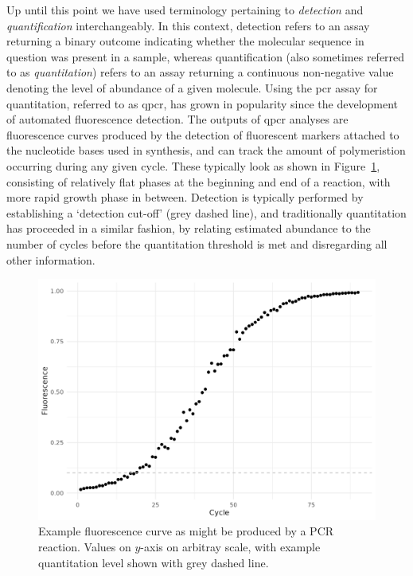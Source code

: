 \documentclass[thesis.tex]{subfiles}
\begin{document}
Up until this point we have used terminology pertaining to \emph{detection} and \emph{quantification} interchangeably. In this context, detection refers to an assay returning a binary outcome indicating whether the molecular sequence in question was present in a sample, whereas quantification (also sometimes referred to as \emph{quantitation}) refers to an assay returning a continuous non-negative value denoting the level of abundance of a given molecule. Using the \gls{pcr} assay for quantitation, referred to as \gls{qpcr}, has grown in popularity since the development of automated fluorescence detection. The outputs of \gls{qpcr} analyses are fluorescence curves produced by the detection of fluorescent markers attached to the nucleotide bases used in synthesis, and can track the amount of polymeristion occurring during any given cycle. These typically look as shown in Figure~\ref{fig:sim_fluor_fig}, consisting of relatively flat phases at the beginning and end of a reaction, with more rapid growth phase in between. Detection is typically performed by establishing a `detection cut-off' (grey dashed line), and traditionally quantitation has proceeded in a similar fashion, by relating estimated abundance to the number of cycles before the quantitation threshold is met and disregarding all other information.

\begin{figure}
    \centering
    \includegraphics[width=5in]{figures/chapter1/sim_fluor_fig.png}
    \caption{Example fluorescence curve as might be produced by a PCR reaction. Values on $y$-axis on arbitray scale, with example quantitation level shown with grey dashed line.}
    \label{fig:sim_fluor_fig}
\end{figure}
\end{document}
